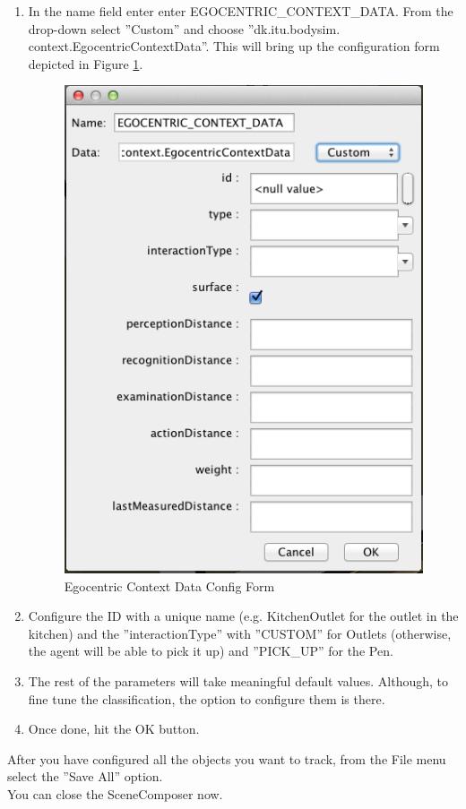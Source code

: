 \begin{enumerate}
	\item In the name field enter enter EGOCENTRIC\_CONTEXT\_DATA. From the drop-down select ''Custom'' and choose ''dk.itu.bodysim. context.EgocentricContextData''. This will bring up the configuration form depicted in Figure \ref{fig:sd_config_form}.
		\begin{figure}[H]
			\centering
			\includegraphics[width=0.8\linewidth]{gfx/Chapter_SD_UserGuide/ssmconfig}
			\caption{Egocentric Context Data Config Form}
			\label{fig:sd_config_form}
		\end{figure}

	\item Configure the ID with a unique name (e.g. KitchenOutlet for the outlet in the kitchen) and the ''interactionType'' with ''CUSTOM'' for Outlets (otherwise, the agent will be able to pick it up) and ''PICK\_UP'' for the Pen.

	\item The rest of the parameters will take meaningful default values. Although, to fine tune the classification, the option to configure them is there.

	\item Once done, hit the OK button.
\end{enumerate}

After you have configured all the objects you want to track, from the File menu select the ''Save All'' option.\\

You can close the SceneComposer now.\\
